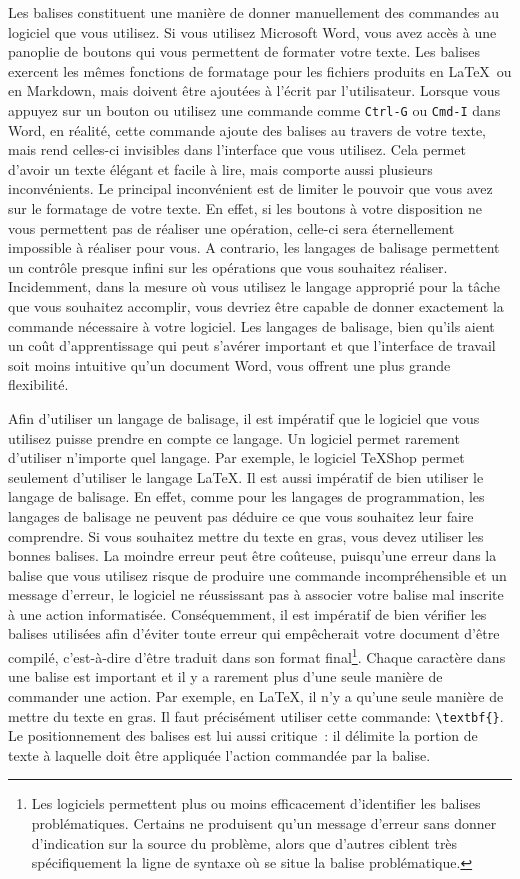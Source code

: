 \documentclass[
  letterpaper,
]{scrbook}
\begin{document}
Les balises constituent une manière de donner manuellement des commandes
au logiciel que vous utilisez. Si vous utilisez Microsoft Word, vous
avez accès à une panoplie de boutons qui vous permettent de formater
votre texte. Les balises exercent les mêmes fonctions de formatage pour
les fichiers produits en \LaTeX~ou en Markdown, mais doivent être
ajoutées à l'écrit par l'utilisateur. Lorsque vous appuyez sur un bouton
ou utilisez une commande comme \texttt{Ctrl-G} ou \texttt{Cmd-I} dans
Word, en réalité, cette commande ajoute des balises au travers de votre
texte, mais rend celles-ci invisibles dans l'interface que vous
utilisez. Cela permet d'avoir un texte élégant et facile à lire, mais
comporte aussi plusieurs inconvénients. Le principal inconvénient est de
limiter le pouvoir que vous avez sur le formatage de votre texte. En
effet, si les boutons à votre disposition ne vous permettent pas de
réaliser une opération, celle-ci sera éternellement impossible à
réaliser pour vous. A contrario, les langages de balisage permettent un
contrôle presque infini sur les opérations que vous souhaitez réaliser.
Incidemment, dans la mesure où vous utilisez le langage approprié pour
la tâche que vous souhaitez accomplir, vous devriez être capable de
donner exactement la commande nécessaire à votre logiciel. Les langages
de balisage, bien qu'ils aient un coût d'apprentissage qui peut s'avérer
important et que l'interface de travail soit moins intuitive qu'un
document Word, vous offrent une plus grande flexibilité.

Afin d'utiliser un langage de balisage, il est impératif que le logiciel
que vous utilisez puisse prendre en compte ce langage. Un logiciel
permet rarement d'utiliser n'importe quel langage. Par exemple, le
logiciel \TeX{}Shop permet seulement d'utiliser le langage \LaTeX. Il
est aussi impératif de bien utiliser le langage de balisage. En effet,
comme pour les langages de programmation, les langages de balisage ne
peuvent pas déduire ce que vous souhaitez leur faire comprendre. Si vous
souhaitez mettre du texte en gras, vous devez utiliser les bonnes
balises. La moindre erreur peut être coûteuse, puisqu'une erreur dans la
balise que vous utilisez risque de produire une commande
incompréhensible et un message d'erreur, le logiciel ne réussissant pas
à associer votre balise mal inscrite à une action informatisée.
Conséquemment, il est impératif de bien vérifier les balises utilisées
afin d'éviter toute erreur qui empêcherait votre document d'être
compilé, c'est-à-dire d'être traduit dans son format final\footnote{Les
  logiciels permettent plus ou moins efficacement d'identifier les
  balises problématiques. Certains ne produisent qu'un message d'erreur
  sans donner d'indication sur la source du problème, alors que d'autres
  ciblent très spécifiquement la ligne de syntaxe où se situe la balise
  problématique.}. Chaque caractère dans une balise est important et il
y a rarement plus d'une seule manière de commander une action. Par
exemple, en \LaTeX, il n'y a qu'une seule manière de mettre du texte en
gras. Il faut précisément utiliser cette commande:
\texttt{\textbackslash{}textbf\{\}}. Le positionnement des balises est
lui aussi critique~: il délimite la portion de texte à laquelle doit
être appliquée l'action commandée par la balise.
\end{document}
